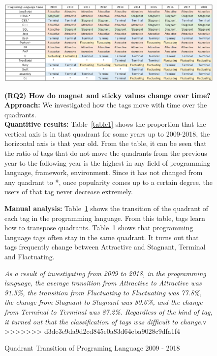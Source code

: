 \documentclass[conference]{IEEEtran}
\begin{document}
\begin{figure}[t]
\begin{oframed}
\begin{oframed}
\begin{table}[h]
 \centering
 \caption{Quadrant Transition of Programing Language 2009 - 2018} 
 \includegraphics[width=.9\hsize]{img/LanguageASFT.eps} 
 \label{table2} 
\end{table}


\textbf{(RQ2) How do magnet and sticky values change over time?} \\
\smallskip\smallskip
\textbf{Approach:}
We investigated how the tags move with time over the quadrants.\\
\textbf{Quantitive results:}
Table~\ref{table1} shows the proportion that the vertical axis is in that quadrant for some years up to 2009-2018, the horizontal axis is that year old. From the table, it can be seen that the ratio of tags that do not move the quadrants from the previous year to the following year is the highest in any field of programming language, framework, environment. Since it has not changed from any quadrant to *, once popularity comes up to a certain degree, the users of that tag never decrease extremely.
\smallskip\smallskip


\textbf{Manual analysis:}
Table~\ref{table2} shows the transition of the quadrant of each tag in the programming language. From this table, tags learn how to transpose quadrants.
Table~\ref{table2} shows that programming language tags often stay in the same quadrant. It turns out that tags frequently change between Attractive and Stagnant, Terminal and Flactuating.
\smallskip\smallskip

\begin{oframed}
\emph{As a result of investigating from 2009 to 2018, in the programming language, the average transition from Attractive to Attractive was 91.5\%, the transition from Fluctuating to Fluctuating was 77.8\%, the change from Stagnant to Stagnant was 80.6\%, and the change from Terminal to Terminal was 87.2\%.  Regardless of the kind of tag, it turned out that the classification of tags was difficult to change.}v
>>>>>>> d3de3e9da9d2cd845e0a83d64eba9028c9dfa1f4
\end{oframed}



\end{oframed}
\end{oframed}
\end{figure}
\end{document}
